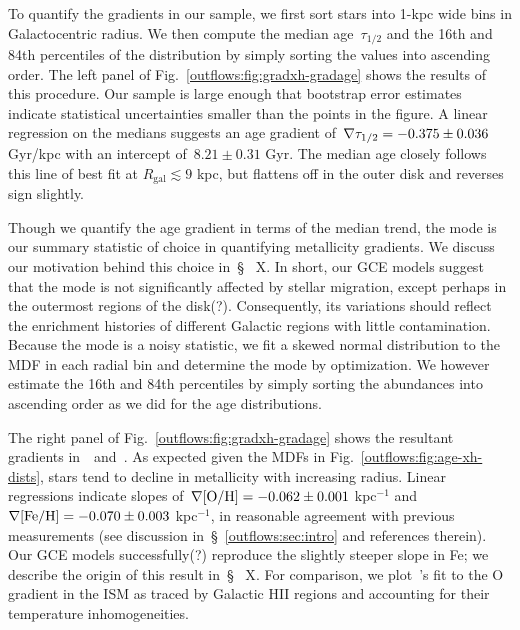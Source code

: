 
To quantify the gradients in our sample, we first sort stars into 1-kpc wide
bins in Galactocentric radius.
We then compute the median age~$\tau_{1/2}$ and the 16th and 84th percentiles
of the distribution by simply sorting the values into ascending order.
The left panel of Fig.~\ref{outflows:fig:gradxh-gradage} shows the results of
this procedure.
Our sample is large enough that bootstrap error estimates indicate statistical
uncertainties smaller than the points in the figure.
A linear regression on the medians suggests an age gradient
of~$\nabla\tau_{1/2} = -0.375 \pm 0.036$ Gyr/kpc with an intercept of~$8.21 \pm 0.31$
Gyr.
The median age closely follows this line of best fit at
$R_\text{gal} \lesssim 9$ kpc, but flattens off in the outer disk and reverses
sign slightly.
\par
Though we quantify the age gradient in terms of the median trend, the mode is
our summary statistic of choice in quantifying metallicity gradients.
We discuss our motivation behind this choice in~\S~{\color{red} X}.
In short, our GCE models suggest that the mode is not significantly affected
by stellar migration, {\color{red} except perhaps in the outermost regions of
the disk(?).}
Consequently, its variations should reflect the enrichment histories of
different Galactic regions with little contamination.
Because the mode is a noisy statistic, we fit a skewed normal distribution to
the MDF in each radial bin and determine the mode by optimization.
We however estimate the 16th and 84th percentiles by simply sorting the
abundances into ascending order as we did for the age distributions.
\par
The right panel of Fig.~\ref{outflows:fig:gradxh-gradage} shows the resultant
gradients in~\oh~and~\feh.
As expected given the MDFs in Fig.~\ref{outflows:fig:age-xh-dists}, stars tend
to decline in metallicity with increasing radius.
Linear regressions indicate slopes of~$\nabla\text{[O/H]} = -0.062 \pm 0.001$ kpc$^{-1}$
and~$\nabla\text{[Fe/H]} = -0.070 \pm 0.003$ kpc$^{-1}$, in reasonable agreement with
previous measurements (see discussion in~\S~\ref{outflows:sec:intro} and
references therein).
Our GCE models {\color{red} successfully(?)} reproduce the slightly steeper
slope in Fe; we describe the origin of this result in~\S~{\color{red} X}.
For comparison, we plot~\citeauthor{MendezDelgado2022}'s
\citeyearpar{MendezDelgado2022} fit to the O gradient in the ISM as traced by
Galactic HII regions and accounting for their temperature inhomogeneities.

